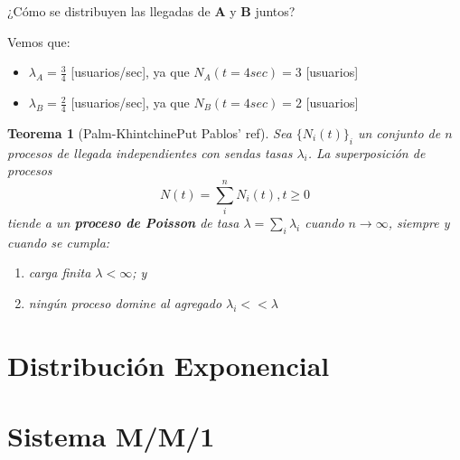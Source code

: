 \documentclass[xcolor={x11names}]{beamer}
\newtheorem{thm}{Teorema}[section] %
\begin{document}
\begin{frame}{\secname}
    ¿Cómo se distribuyen las llegadas
    de \textbf{\color{Firebrick1}A} y
    \textbf{\color{Firebrick4}B} juntos?

    \begin{figure}
        
    \end{figure}

    Vemos que:
    \begin{itemize}
        \item {\color{Firebrick1}$\lambda_A=\tfrac{3}{4}$} [usuarios/sec], ya que {\color{Firebrick1}$N_A(t=4sec)=3$} [usuarios]
        \item {\color{Firebrick4}$\lambda_B=\tfrac{2}{4}$} [usuarios/sec], ya que {\color{Firebrick4}$N_B(t=4sec)=2$} [usuarios]
    \end{itemize}

\end{frame}



\begin{frame}{\secname}
    \begin{thm}[Palm-Khintchine{\color{red}Put Pablos' ref}]
        Sea $\{N_i(t)\}_i$ un conjunto de $n$
        procesos de llegada independientes
        con sendas tasas
        $\lambda_i$.
        La superposición de procesos
        \begin{equation}
            N(t)=\sum_i^n N_i(t), t\geq0
        \end{equation}
        tiende a un \textbf{proceso de Poisson}
        de tasa $\lambda=\sum_i \lambda_i$
        cuando $n\to\infty$, siempre y cuando
        se cumpla:
        \begin{enumerate}
            \item carga finita $\lambda<\infty$; y
            \item ningún proceso domine al
                agregado $\lambda_i<<\lambda$
        \end{enumerate}
    \end{thm}
    
\end{frame}



\section{Distribución Exponencial}
\section{Sistema M/M/1}
\end{document}
